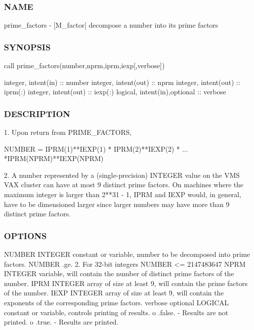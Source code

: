 \subsubsection*{N\+A\+ME}

prime\+\_\+factors -\/ \mbox{[}M\+\_\+factor\mbox{]} decompose a number into its prime factors \subsubsection*{S\+Y\+N\+O\+P\+S\+IS}

call prime\+\_\+factors(number,nprm,iprm,iexp\mbox{[},verbose\mbox{]})

integer, intent(in) \+:\+: number integer, intent(out) \+:\+: nprm integer, intent(out) \+:\+: iprm(\+:) integer, intent(out) \+:\+: iexp(\+:) logical, intent(in),optional \+:\+: verbose \subsubsection*{D\+E\+S\+C\+R\+I\+P\+T\+I\+ON}

\begin{DoxyVerb}1. Upon return from PRIME_FACTORS,

        NUMBER = IPRM(1)**IEXP(1) * IPRM(2)**IEXP(2) * ...
                 *IPRM(NPRM)**IEXP(NPRM)

2. A number represented by a (single-precision) INTEGER
   value on the VMS VAX cluster can have at most 9 distinct
   prime factors. On machines where the maximum integer is
   larger than 2**31 - 1, IPRM and IEXP would, in general,
   have to be dimensioned larger since larger numbers may
   have more than 9 distinct prime factors.
\end{DoxyVerb}
 \subsubsection*{O\+P\+T\+I\+O\+NS}

\begin{DoxyVerb}NUMBER   INTEGER constant or variable, number to be decomposed into
         prime factors. NUMBER .ge. 2.
         For 32-bit integers NUMBER <= 2147483647
NPRM     INTEGER variable, will contain the number of distinct prime
         factors of the number.
IPRM     INTEGER array of size at least 9, will contain the prime
         factors of the number.
IEXP     INTEGER array of size at least 9, will contain the
         exponents of the corresponding prime factors.
verbose  optional LOGICAL constant or variable, controls printing
         of results.
          o .false. - Results are not printed.
          o .true. - Results are printed.
\end{DoxyVerb}
